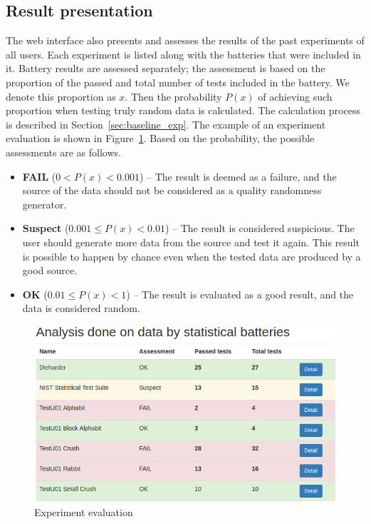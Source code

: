 \documentclass[
	digital,    %
	oneside,
	color,
	11pt,
	nocover,
	notable,
	nolof,
	nolot,
]{fithesis3}
\theoremstyle{definition}
\theoremstyle{remark}
\begin{document}
\subsection*{Result presentation}
The web interface also presents and assesses the results of the past experiments of all users. Each experiment is listed along with the batteries that were included in it. Battery results are assessed separately; the assessment is based on the proportion of the passed and total number of tests included in the battery. We denote this proportion as $x$. Then the probability $P(x)$ of achieving such proportion when testing truly random data is calculated. The calculation process is described in Section~\ref{sec:baseline_exp}. The example of an experiment evaluation is shown in Figure~\ref{fig:rtt_assessment}. Based on the probability, the possible assessments are as follows.

\begin{itemize}
\item \textbf{FAIL} ($0 < P(x) < 0.001$) -- The result is deemed as a failure, and the source of the data should not be considered as a quality randomness generator.
\item \textbf{Suspect} ($0.001 \leq P(x) < 0.01$) -- The result is considered suspicious. The user should generate more data from the source and test it again. This result is possible to happen by chance even when the tested data are produced by a good source.
\item \textbf{OK} ($0.01 \leq P(x) < 1$) -- The result is evaluated as a good result, and the data is considered random.
\end{itemize}

\begin{figure}[H]
\begin{nomar}
\centering
\includegraphics[width=\textwidth]{figures/rtt-assessment.png} 
\end{nomar}
\caption{Experiment evaluation}
\label{fig:rtt_assessment}
\end{figure}
\end{document}
